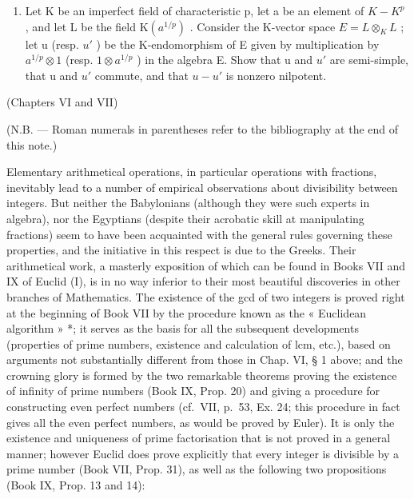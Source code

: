 \begin{enumerate}
\def\labelenumi{\arabic{enumi})}
\setcounter{enumi}{13}
\tightlist
\item
  Let K be an imperfect field of characteristic p, let a be an element of \(K - K^{p}\) , and let L be the field \(\mathrm{K}(a^{1/p})\) . Consider the K-vector space \(E = L \otimes_{K} L\) ; let u (resp. \(u'\) ) be the K-endomorphism of E given by multiplication by \(a^{1/p} \otimes 1\) (resp. \(1 \otimes a^{1/p}\) ) in the algebra E. Show that u and \(u'\) are semi-simple, that u and \(u'\) commute, and that \(u - u'\) is nonzero nilpotent.
\end{enumerate}


(Chapters VI and VII)

(N.B. --- Roman numerals in parentheses refer to the bibliography at the end of this note.)

Elementary arithmetical operations, in particular operations with fractions, inevitably lead to a number of empirical observations about divisibility between integers. But neither the Babylonians (although they were such experts in algebra), nor the Egyptians (despite their acrobatic skill at manipulating fractions) seem to have been acquainted with the general rules governing these properties, and the initiative in this respect is due to the Greeks. Their arithmetical work, a masterly exposition of which can be found in Books VII and IX of Euclid (I), is in no way inferior to their most beautiful discoveries in other branches of Mathematics. The existence of the gcd of two integers is proved right at the beginning of Book VII by the procedure known as the « Euclidean algorithm » *; it serves as the basis for all the subsequent developments (properties of prime numbers, existence and calculation of lcm, etc.), based on arguments not substantially different from those in Chap. VI, § 1 above; and the crowning glory is formed by the two remarkable theorems proving the existence of infinity of prime numbers (Book IX, Prop. 20) and giving a procedure for constructing even perfect numbers (cf.~VII, p.~53, Ex. 24; this procedure in fact gives all the even perfect numbers, as would be proved by Euler). It is only the existence and uniqueness of prime factorisation that is not proved in a general manner; however Euclid does prove explicitly that every integer is divisible by a prime number (Book VII, Prop. 31), as well as the following two propositions (Book IX, Prop. 13 and 14):

